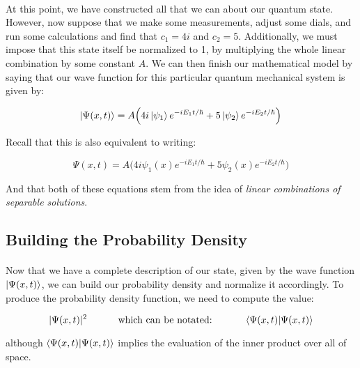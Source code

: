 \documentclass[12pt,letterpaper]{book}
\begin{document}
\paragraph*{}At this point, we have constructed all that we can about our quantum state. However, now suppose that we make some measurements, adjust some dials, and run some calculations and find that $c_1 = 4i$ and $c_2 = 5$. Additionally, we must impose that this state itself be normalized to 1, by multiplying the whole linear combination by some constant $A$. We can then finish our mathematical model  by saying that our wave function for this particular quantum mechanical system is given by:

\begin{equation}
\label{ex1 sys ket dirac}
\ket{\Psi(x,t)} = A \Big( 4i \ket{\psi_1}e^{-iE_1t/\hbar} + 5 \ket{\psi_2} e^{-iE_2t/\hbar} \Big)
\end{equation}

Recall that this is also equivalent to writing:

\begin{equation}
\label{ex1 sys non-dirac}
\Psi(x,t) =  A \Big( 4i\psi_1(x)e^{-iE_1t/\hbar} + 5\psi_2(x)e^{-iE_2t/\hbar} \Big)
\end{equation}

And that both of these equations stem from the idea of \textit{linear combinations of separable solutions}.


\subsection*{Building the Probability Density}

\paragraph*{}Now that we have a complete description of our state, given by the wave function $\ket{\Psi(x,t)}$, we can build our probability density and normalize it accordingly. To produce the probability density function, we need to compute the value:

\begin{equation}
|\Psi(x,t)|^2 \text{\hspace{1cm} which can be notated: \hspace{1cm}} \braket{\Psi(x,t)}{\Psi(x,t)}
\end{equation}

although $\braket{\Psi(x,t)}{\Psi(x,t)}$ implies the evaluation of the inner product over all of space.
\end{document}

